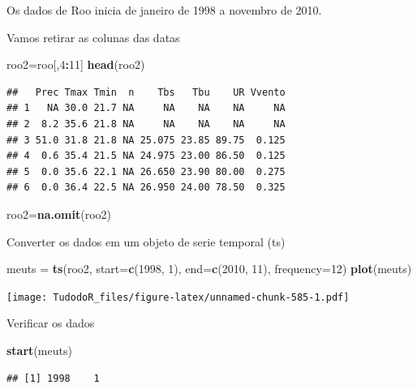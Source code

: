 \documentclass[
]{book}
\newenvironment{Shaded}{\begin{snugshade}}{\end{snugshade}}
\newcommand{\DataTypeTok}[1]{\textcolor[rgb]{0.13,0.29,0.53}{#1}}
\newcommand{\DecValTok}[1]{\textcolor[rgb]{0.00,0.00,0.81}{#1}}
\newcommand{\KeywordTok}[1]{\textcolor[rgb]{0.13,0.29,0.53}{\textbf{#1}}}
\newcommand{\NormalTok}[1]{#1}
\newcommand{\OperatorTok}[1]{\textcolor[rgb]{0.81,0.36,0.00}{\textbf{#1}}}
\newcommand{\StringTok}[1]{\textcolor[rgb]{0.31,0.60,0.02}{#1}}
\begin{document}
Os dados de Roo inicia de janeiro de 1998 a novembro de 2010.

Vamos retirar as colunas das datas

\begin{Shaded}
\begin{Highlighting}[]
\NormalTok{roo2=roo[,}\DecValTok{4}\OperatorTok{:}\DecValTok{11}\NormalTok{]}
\KeywordTok{head}\NormalTok{(roo2)}
\end{Highlighting}
\end{Shaded}

\begin{verbatim}
##   Prec Tmax Tmin  n    Tbs   Tbu    UR Vvento
## 1   NA 30.0 21.7 NA     NA    NA    NA     NA
## 2  8.2 35.6 21.8 NA     NA    NA    NA     NA
## 3 51.0 31.8 21.8 NA 25.075 23.85 89.75  0.125
## 4  0.6 35.4 21.5 NA 24.975 23.00 86.50  0.125
## 5  0.0 35.6 22.1 NA 26.650 23.90 80.00  0.275
## 6  0.0 36.4 22.5 NA 26.950 24.00 78.50  0.325
\end{verbatim}

\begin{Shaded}
\begin{Highlighting}[]
\NormalTok{roo2=}\KeywordTok{na.omit}\NormalTok{(roo2)}
\end{Highlighting}
\end{Shaded}

Converter os dados em um objeto de serie temporal (ts)

\begin{Shaded}
\begin{Highlighting}[]
\NormalTok{meuts =}\StringTok{ }\KeywordTok{ts}\NormalTok{(roo2, }\DataTypeTok{start=}\KeywordTok{c}\NormalTok{(}\DecValTok{1998}\NormalTok{, }\DecValTok{1}\NormalTok{), }\DataTypeTok{end=}\KeywordTok{c}\NormalTok{(}\DecValTok{2010}\NormalTok{, }\DecValTok{11}\NormalTok{), }\DataTypeTok{frequency=}\DecValTok{12}\NormalTok{) }
\KeywordTok{plot}\NormalTok{(meuts)}
\end{Highlighting}
\end{Shaded}

\texttt{[image: TudodoR\_files/figure-latex/unnamed-chunk-585-1.pdf]}

Verificar os dados

\begin{Shaded}
\begin{Highlighting}[]
\KeywordTok{start}\NormalTok{(meuts)}
\end{Highlighting}
\end{Shaded}

\begin{verbatim}
## [1] 1998    1
\end{verbatim}
\end{document}
